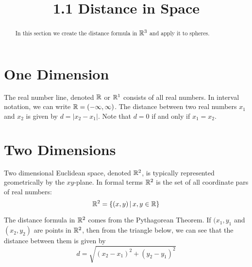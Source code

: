 \documentclass[handout]{ximera}
\title{1.1 Distance in Space}
\begin{document}
\begin{abstract}
In this section we create the distance formula in $\mathbb R^3$ and apply it to spheres.
\end{abstract}

\maketitle


\section{One Dimension}

The real number line, denoted $\mathbb R$ or $\mathbb R^1$ consists of all real numbers.  In interval notation, we can write $\mathbb R = (-\infty, \infty)$.
The distance between two real numbers $x_1$ and $x_2$ is given by $d = |x_2 - x_1|$. Note that $d = 0$ if and only if $x_1 = x_2$.


\begin{center}
\end{center}

\section{Two Dimensions}
Two dimensional Euclidean space, denoted $\mathbb R^2$, is typically represented geometrically by the $xy$-plane. 
In formal terms $\mathbb R^2$ is the set of all coordinate pars of real numbers:
 \[
\mathbb R^2 = \{(x,y) \,|\, x, y \in \mathbb R\}
\]

The distance formula in $\mathbb R^2$ comes from the Pythagorean Theorem. If $(x_1, y_1$ and $(x_2, y_2)$ are points in $\mathbb R^2$, then from the triangle below,
we can see that the distance between them is given by 
\[
d = \sqrt{(x_2 - x_1)^2 + (y_2 - y_1)^2}
\]
\end{document}
